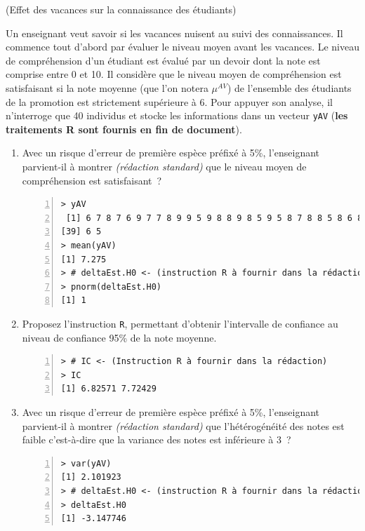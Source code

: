 \documentclass[10pt]{report}
\newcommand{\redstd}{\textit{(rédaction standard) }}
\begin{document}
\begin{exercice} (Effet des vacances sur la connaissance des étudiants)

Un enseignant veut savoir si les vacances nuisent au suivi des connaissances. Il commence tout d'abord par évaluer le niveau moyen avant les vacances. Le niveau de compréhension d'un étudiant est évalué par un devoir dont la note est comprise entre 0 et 10. Il consid{\`e}re que le niveau moyen de compréhension est satisfaisant si la note moyenne  (que l'on notera $\mu^{AV}$) de l'ensemble des étudiants de la promotion est strictement sup{\'e}rieure {\`a} 6. Pour appuyer son analyse, il n'interroge que 40 individus et stocke les informations dans un vecteur \texttt{yAV} (\textbf{les traitements R sont fournis en fin de document}).


\begin{enumerate}
\item 
Avec un risque d'erreur de premi{\`e}re esp{\`e}ce pr{\'e}fix{\'e} {\`a} 5\%, l'enseignant parvient-il {\`a} montrer \redstd que le niveau moyen de compréhension est satisfaisant~?

\IndicR
\begin{Verbatim}[frame=leftline,fontfamily=tt,fontshape=n,numbers=left]
> yAV
 [1] 6 7 8 7 6 9 7 7 8 9 9 5 9 8 8 9 8 5 9 5 8 7 8 8 5 8 6 8 9 7 6 9 5 6 9 9 8 5
[39] 6 5
> mean(yAV)
[1] 7.275
> # deltaEst.H0 <- (instruction R à fournir dans la rédaction)
> pnorm(deltaEst.H0)
[1] 1
\end{Verbatim}

 





\item  
Proposez l'instruction \texttt{R}, permettant d'obtenir l'intervalle de confiance au niveau de confiance 95\% de la note moyenne.

\begin{Verbatim}[frame=leftline,fontfamily=tt,fontshape=n,numbers=left]
> # IC <- (Instruction R à fournir dans la rédaction)
> IC
[1] 6.82571 7.72429
\end{Verbatim}




\item 
Avec un risque d'erreur de premi{\`e}re esp{\`e}ce pr{\'e}fix{\'e} {\`a} 5\%, l'enseignant parvient-il {\`a} montrer \redstd que l'hétérogénéité des notes est faible c'est-à-dire que la variance des notes est inférieure à 3~?

\IndicR
\begin{Verbatim}[frame=leftline,fontfamily=tt,fontshape=n,numbers=left]
> var(yAV)
[1] 2.101923
> # deltaEst.H0 <- (instruction R à fournir dans la rédaction)
> deltaEst.H0
[1] -3.147746
\end{Verbatim}


\end{enumerate}
\end{exercice}
\end{document}
